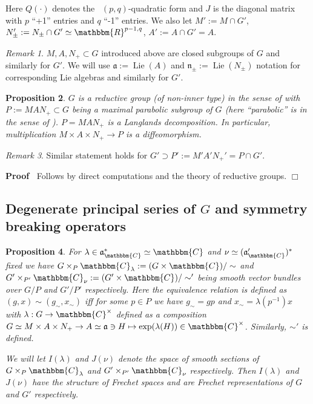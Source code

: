 \documentclass{article}
\newcommand{\assign}{:=}
\newcommand{\tmop}[1]{\ensuremath{\operatorname{#1}}}
\renewenvironment{proof}{\noindent\textbf{Proof\ }}{\hspace*{\fill}$\Box$\medskip}
\newtheorem{proposition}{Proposition}[section]
\theoremstyle{remark}
\newtheorem{remark}[proposition]{Remark}
\begin{document}
Here $Q (\cdot)$ denotes the \ $(p, q)$-quadratic form and $J$ is the diagonal
matrix with $p$ ``+1'' entries and $q$ ``-1'' entries. We also let $M' \assign
M \cap G'$, $N_{\pm}' \assign N_{\pm} \cap G' \simeq \mathbbm{R}^{p - 1, q}$,
$A' \assign A \cap G' = A$.

\begin{remark}
  $M, A, N_+ \subset G$ introduced above are closed subgroups of $G$ and
  similarly for $G'$. We will use $\mathfrak{a} \assign \tmop{Lie} (A)$ and
  $\mathfrak{n}_{\pm} \assign \tmop{Lie} (N_{\pm})$ notation for corresponding
  Lie algebras and similarly for $G'$.
\end{remark}

\begin{proposition}
  $G$ is a reductive group (of non-inner type) in the sense of
  {\cite{wallach1988real}} with $P \assign M A N_+ \subset G$ being a maximal
  parabolic subgroup of $G$ (here ``parabolic'' is in the sense of {\cite[sec.
  2.2]{wallach1988real}}). $P = M A N_+$ is a Langlands decomposition. In
  particular, multiplication $M \times A \times N_+ \rightarrow P$ is a
  diffeomorphism.
\end{proposition}

\begin{remark}
  Similar statement holds for $G' \supset P' \assign M' A' N_+' = P \cap G'$.
\end{remark}

\begin{proof}
  Follows by direct computations and the theory of reductive groups.
\end{proof}

\subsection{Degenerate principal series of $G$ and symmetry breaking
operators}

\begin{proposition}
  \label{def-n-nots:prop-degseries}For $\lambda \in
  \mathfrak{a}_{\mathbbm{C}}^{\ast} \simeq \mathbbm{C}$ and $\nu \simeq
  (\mathfrak{a}_{\mathbbm{C}}')^{\ast}$ fixed we have $G \times_P
  \mathbbm{C}_{\lambda} \assign (G \times \mathbbm{C}) / \sim$ and $G'
  \times_{P'} \mathbbm{C}_{\nu} \assign (G' \times \mathbbm{C}) / \sim'$ being
  smooth vector bundles over $G / P$ and $G' / P'$ respectively. Here the
  equivalence relation is defined as $(g, x) \sim (g_{\sim}, x_{\sim})$ iff
  for some $p \in P$ we have $g_{\sim} = g p$ and $x_{\sim} = \lambda (p^{-
  1}) x$ with $\lambda : G \rightarrow \mathbbm{C}^{\times}$ defined as a
  composition $G \simeq M \times A \times N_+ \rightarrow A \simeq
  \mathfrak{a} \ni H \mapsto \exp (\lambda (H)) \in \mathbbm{C}^{\times}$.
  Similarly, $\sim'$ is defined.
  
  We will let $I (\lambda)$ and $J (\nu)$ denote the space of smooth sections
  of $G \times_P \mathbbm{C}_{\lambda}$ and $G' \times_{P'} \mathbbm{C}_{\nu}$
  respectively. Then $I (\lambda)$ and $J (\nu)$ have the structure of Frechet
  spaces and are Frechet representations of $G$ and $G'$ respectively.
\end{proposition}
\end{document}
